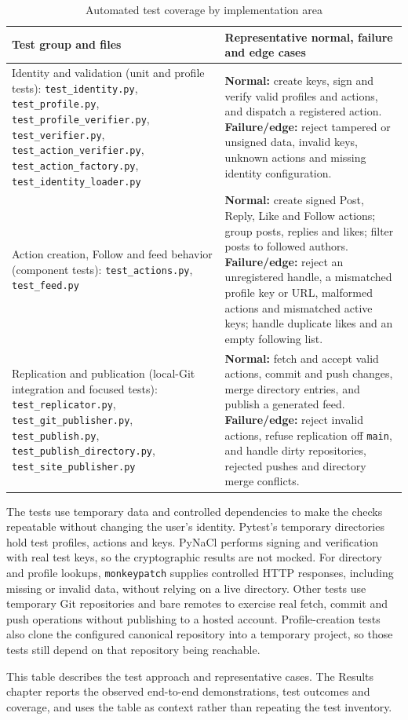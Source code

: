 \begin{table}[htbp]
    \centering
    \small
    \caption{Automated test coverage by implementation area}
    \label{tab:implementation-test-coverage}
    \begin{tabular}{|p{4.8cm}|p{9.7cm}|}
        \hline
        \textbf{Test group and files} &
        \textbf{Representative normal, failure and edge cases} \\
        \hline
        Identity and validation (unit and profile tests):
        \texttt{test\_identity.py}, \texttt{test\_profile.py},
        \texttt{test\_profile\_verifier.py}, \texttt{test\_verifier.py},
        \texttt{test\_action\_verifier.py}, \texttt{test\_action\_factory.py},
        \texttt{test\_identity\_loader.py}
        & \textbf{Normal:} create keys, sign and verify valid profiles and
        actions, and dispatch a registered action. \textbf{Failure/edge:}
        reject tampered or unsigned data, invalid keys, unknown actions and
        missing identity configuration. \\
        \hline
        Action creation, Follow and feed behavior (component tests):
        \texttt{test\_actions.py}, \texttt{test\_feed.py}
        & \textbf{Normal:} create signed Post, Reply, Like and Follow actions;
        group posts, replies and likes; filter posts to followed authors.
        \textbf{Failure/edge:} reject an unregistered handle, a mismatched
        profile key or URL, malformed actions and mismatched active keys;
        handle duplicate likes and an empty following list. \\
        \hline
        Replication and publication (local-Git integration and focused tests):
        \texttt{test\_replicator.py}, \texttt{test\_git\_publisher.py},
        \texttt{test\_publish.py}, \texttt{test\_publish\_directory.py},
        \texttt{test\_site\_publisher.py}
        & \textbf{Normal:} fetch and accept valid actions, commit and push
        changes, merge directory entries, and publish a generated feed.
        \textbf{Failure/edge:} reject invalid actions, refuse replication off
        \texttt{main}, and handle dirty repositories, rejected pushes and
        directory merge conflicts. \\
        \hline
    \end{tabular}
\end{table}

The tests use temporary data and controlled dependencies to make the checks
repeatable without changing the user's identity. Pytest's temporary
directories hold test profiles, actions and keys. PyNaCl performs signing and
verification with real test keys, so the cryptographic results are not
mocked. For directory and profile lookups, \texttt{monkeypatch} supplies
controlled HTTP responses, including missing or invalid data, without relying
on a live directory. Other tests use temporary Git repositories and bare
remotes to exercise real fetch, commit and push operations without publishing
to a hosted account. Profile-creation tests also clone the configured
canonical repository into a temporary project, so those tests still depend
on that repository being reachable.

This table describes the test approach and representative cases. The Results
chapter reports the observed end-to-end demonstrations, test outcomes and
coverage, and uses the table as context rather than repeating the test
inventory.

